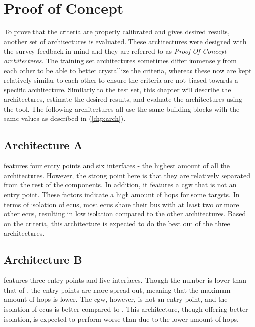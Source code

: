 \chapter{Proof of Concept}
\label{chp:compeval}

To prove that the criteria are properly calibrated and gives desired results, another set of architectures is evaluated.
These architectures were designed with the survey feedback in mind and they are referred to as \textit{Proof Of Concept architectures}.
The training set architectures sometimes differ immensely from each other to be able to better crystallize the criteria,
whereas these now are kept relatively similar to each other to ensure the criteria are not biased towards a specific architecture.
Similarly to the test set, this chapter will describe the architectures, estimate the desired results, and evaluate the architectures using the tool.
The following architectures all use the same building blocks with the same values as described in (\ref{chp:arch}).

\section{Architecture A}
\label{sec:archa}

 features four entry points and six interfaces - the highest amount of all the architectures.
However, the strong point here is that they are relatively separated from the rest of the components.
In addition, it features a \acrshort{cgw} that is not an entry point.
These factors indicate a high amount of hops for some targets.
In terms of isolation of \acrshort{ecu}s, most \acrshort{ecu}s share their bus with at least two or 
more other \acrshort{ecu}s, resulting in low isolation compared to the other architectures.
Based on the criteria, this architecture is expected to do the best out of the three architectures.

\section{Architecture B}
\label{sec:archb}

 features three entry points and five interfaces.
Though the number is lower than that of , the entry points are more spread out, meaning that the maximum amount of hops is lower.
The \acrshort{cgw}, however, is not an entry point, and the isolation of \acrshort{ecu}s is better compared to .
This architecture, though offering better isolation, is expected to perform worse than  due to the lower amount of hops.

